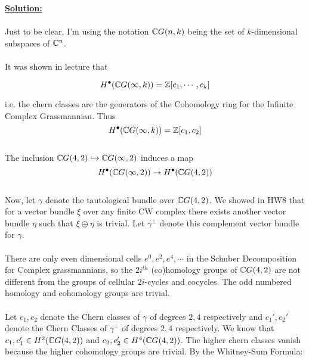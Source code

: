 \documentclass[11pt]{article}
\begin{document}
\vskip 0.5cm
\textbf{\underline{Solution:}}
\\
\\
Just to be clear, I'm using the notation $\mathbb{C} G(n, k)$ being the set of $k$-dimensional subspaces of $\mathbb{C}^n$.
\\
\\
It was shown in lecture that 

\begin{dottedbox}
  \begin{redbox}
    \begin{lemma}
      $$ H^{\bullet}(\mathbb{C} G(\infty, k)) = \mathbb{Z}[c_1, \cdots, c_k]$$
    \end{lemma}
  \end{redbox}

\end{dottedbox} i.e. the chern classes are the generators of the Cohomology ring for the Infinite Complex Grassmannian. Thus $$ H^{\bullet}(\mathbb{C} G(\infty, k)) = \mathbb{Z}[c_1, c_2] $$
\\
The inclusion $\mathbb{C} G(4,2) \hookrightarrow \mathbb{C} G(\infty, 2)$ induces a map $$ H^{\bullet} (\mathbb{C} G(\infty, 2)) \rightarrow H^{\bullet}(\mathbb{C} G(4, 2)) $$
\\
Now, let $\gamma$ denote the tautological bundle over $\mathbb{C} G(4,2)$. We showed in HW8 that for a vector bundle $\xi$ over any finite CW complex there exists another vector bundle $\eta$ such that $\xi \oplus \eta$ is trivial. Let $\gamma^{\perp}$ denote this complement vector bundle for $\gamma$.
\\
\\
There are only even dimensional cells $e^0, e^2, e^4, \cdots$ in the Schuber Decomposition for Complex grassmannians, so the $2i^{th}$ (co)homology groups of $\mathbb{C} G(4,2)$ are not different from the groups of cellular $2i$-cycles and cocycles. The odd numbered homology and cohomology groups are trivial. 
\\
\\
Let $c_1, c_2$ denote the Chern classes of $\gamma$ of degrees $2,4$ respectively and $c_1', c_2'$ denote the Chern Classes of $\gamma^{\perp}$ of degrees $2,4$ respectively. 
We know that $c_1, c_1' \in H^2(\mathbb{C} G(4,2))$ and $c_2, c_2' \in H^4(\mathbb{C} G(4,2))$. The higher chern classes vanish because the higher cohomology groups are trivial. By the Whitney-Sum Formula:
\end{document}
